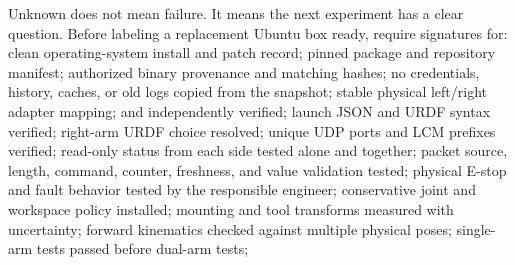 \markdownRendererUlEnd \markdownRendererInterblockSeparator
{}Unknown does not mean failure. It means the next experiment has a clear question.\markdownRendererInterblockSeparator
{}
\markdownRendererSectionEnd \markdownRendererSectionBegin
{}\markdownRendererInterblockSeparator
{}Before labeling a replacement Ubuntu box ready, require signatures for:\markdownRendererInterblockSeparator
{}\markdownRendererUlBegin
\markdownRendererUlItem \markdownRendererUntickedBox{} clean operating-system install and patch record;\markdownRendererUlItemEnd 
\markdownRendererUlItem \markdownRendererUntickedBox{} pinned package and repository manifest;\markdownRendererUlItemEnd 
\markdownRendererUlItem \markdownRendererUntickedBox{} authorized binary provenance and matching hashes;\markdownRendererUlItemEnd 
\markdownRendererUlItem \markdownRendererUntickedBox{} no credentials, history, caches, or old logs copied from the snapshot;\markdownRendererUlItemEnd 
\markdownRendererUlItem \markdownRendererUntickedBox{} stable physical left/right adapter mapping;\markdownRendererUlItemEnd 
\markdownRendererUlItem \markdownRendererUntickedBox{}  and  independently verified;\markdownRendererUlItemEnd 
\markdownRendererUlItem \markdownRendererUntickedBox{} launch JSON and URDF syntax verified;\markdownRendererUlItemEnd 
\markdownRendererUlItem \markdownRendererUntickedBox{} right-arm URDF choice resolved;\markdownRendererUlItemEnd 
\markdownRendererUlItem \markdownRendererUntickedBox{} unique UDP ports and LCM prefixes verified;\markdownRendererUlItemEnd 
\markdownRendererUlItem \markdownRendererUntickedBox{} read-only status from each side tested alone and together;\markdownRendererUlItemEnd 
\markdownRendererUlItem \markdownRendererUntickedBox{} packet source, length, command, counter, freshness, and value validation tested;\markdownRendererUlItemEnd 
\markdownRendererUlItem \markdownRendererUntickedBox{} physical E-stop and fault behavior tested by the responsible engineer;\markdownRendererUlItemEnd 
\markdownRendererUlItem \markdownRendererUntickedBox{} conservative joint and workspace policy installed;\markdownRendererUlItemEnd 
\markdownRendererUlItem \markdownRendererUntickedBox{} mounting and tool transforms measured with uncertainty;\markdownRendererUlItemEnd 
\markdownRendererUlItem \markdownRendererUntickedBox{} forward kinematics checked against multiple physical poses;\markdownRendererUlItemEnd 
\markdownRendererUlItem \markdownRendererUntickedBox{} single-arm tests passed before dual-arm tests;\markdownRendererUlItemEnd 
